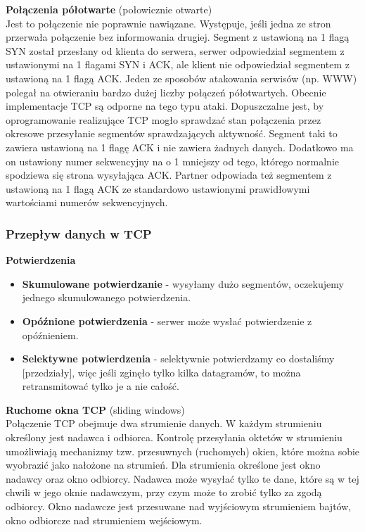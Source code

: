 \documentclass[../main.tex]{subfiles}
\begin{document}
    \textbf{Połączenia półotwarte} (połowicznie otwarte)\\
    Jest to połączenie nie poprawnie nawiązane. Występuje, jeśli jedna ze stron przerwała połączenie bez informowania drugiej. Segment z ustawioną na 1 flagą SYN został przesłany od
    klienta do serwera, serwer odpowiedział segmentem z ustawionymi na 1 flagami SYN i ACK,
    ale klient nie odpowiedział segmentem z ustawioną na 1 flagą ACK.
    Jeden ze sposobów atakowania serwisów (np. WWW) polegał na otwieraniu bardzo dużej
    liczby połączeń półotwartych. Obecnie implementacje TCP są odporne na tego typu ataki.
    Dopuszczalne jest, by oprogramowanie realizujące TCP mogło sprawdzać stan połączenia
    przez okresowe przesyłanie segmentów sprawdzających aktywność. Segment taki to zawiera
    ustawioną na 1 flagę ACK i nie zawiera żadnych danych. Dodatkowo ma on ustawiony numer
    sekwencyjny na o 1 mniejszy od tego, którego normalnie spodziewa się strona wysyłająca
    ACK. Partner odpowiada też segmentem z ustawioną na 1 flagą ACK ze standardowo
    ustawionymi prawidłowymi wartościami numerów sekwencyjnych.



    \subsubsection{Przepływ danych w TCP}
    \textbf{Potwierdzenia}
    \begin{itemize}
        \item \textbf{Skumulowane potwierdzanie} - wysyłamy dużo segmentów, oczekujemy jednego skumulowanego potwierdzenia.
        \item \textbf{Opóźnione potwierdzenia} - serwer może wysłać potwierdzenie z opóźnieniem.
        \item \textbf{Selektywne potwierdzenia} - selektywnie potwierdzamy co dostaliśmy [przedziały], więc jeśli zginęło tylko kilka datagramów, to można retransmitować tylko je a nie całość.
    \end{itemize}

    \textbf{Ruchome okna TCP} (sliding windows)\\
    Połączenie TCP obejmuje dwa strumienie danych. W każdym strumieniu określony jest
    nadawca i odbiorca. Kontrolę przesyłania oktetów w strumieniu umożliwiają mechanizmy
    tzw. przesuwnych (ruchomych) okien, które można sobie wyobrazić jako nałożone na
    strumień. Dla strumienia określone jest okno nadawcy oraz okno odbiorcy. Nadawca może
    wysyłać tylko te dane, które są w tej chwili w jego oknie nadawczym, przy czym może to
    zrobić tylko za zgodą odbiorcy. Okno nadawcze jest przesuwane nad wyjściowym
    strumieniem bajtów, okno odbiorcze nad strumieniem wejściowym.\\
\end{document}
